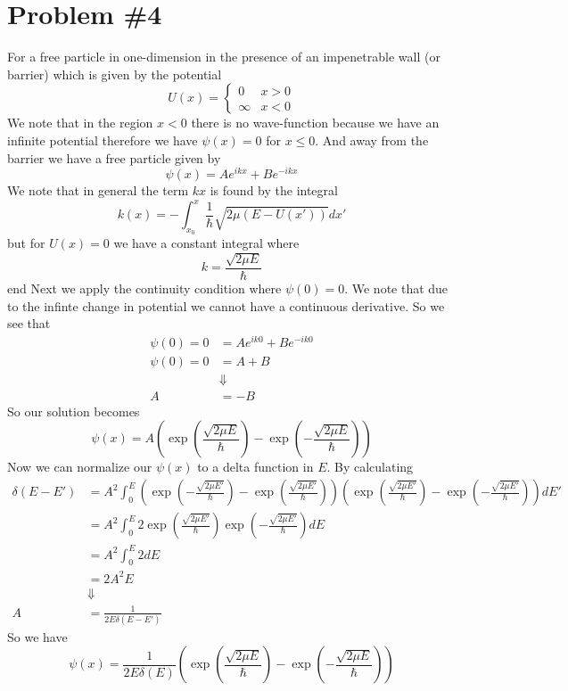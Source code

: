 \documentclass[11pt]{article}
\numberwithin{equation}{section}
\begin{document}
\pagebreak

\section{Problem \#4}
For a free particle in one-dimension in the presence of an impenetrable wall (or barrier) 
which is given by the potential
$$U(x) = \left\{\begin{array}{cl}
                  0       &x>0\\ 
                  \infty  &x<0
          \end{array}\right.$$
We note that in the region $x<0$ there is no wave-function because we have an infinite 
potential therefore we have $\psi(x)=0$ for $x\le0$. And away from the barrier we have a free
particle given by
$$\psi(x) = Ae^{ikx} + Be^{-ikx}$$
We note that in general the term $kx$ is found by the integral
$$k(x) = -\int_{x_0}^{x}\frac{1}{\hbar}\sqrt{2\mu(E-U(x'))}dx'$$
but for $U(x)=0$ we have a constant integral where 
$$k = \frac{\sqrt{2\mu{E}}}{\hbar}$$
end
Next we apply the continuity condition where $\psi(0) = 0$. We note that due to the infinte
change in potential we cannot have a continuous derivative. So we see that
\begin{align*}
\psi(0) = 0 &= Ae^{ik0} + Be^{-ik0}\\
\psi(0) = 0 &= A + B\\
&\Downarrow\\
A &= -B
\end{align*}
So our solution becomes
$$\psi(x) = A\left(\exp\left(\frac{\sqrt{2\mu{E}}}{\hbar}\right) - \exp\left(-\frac{\sqrt{2\mu{E}}}{\hbar}\right)\right)$$
Now we can normalize our $\psi(x)$ to a delta function in $E$. By calculating 
\begin{align*}
\delta(E-E') &= A^2\int_{0}^{E}\left(\exp\left(-\frac{\sqrt{2\mu{E'}}}{\hbar}\right) - \exp\left(\frac{\sqrt{2\mu{E'}}}{\hbar}\right)\right)\left(\exp\left(\frac{\sqrt{2\mu{E'}}}{\hbar}\right) - \exp\left(-\frac{\sqrt{2\mu{E'}}}{\hbar}\right)\right)dE'\\
&= A^2\int_{0}^{E}2\exp\left(\frac{\sqrt{2\mu{E'}}}{\hbar}\right)\exp\left(-\frac{\sqrt{2\mu{E'}}}{\hbar}\right)dE\\
&= A^2\int_{0}^{E}2dE\\
&= 2A^2E\\
&\Downarrow\\
A &= \frac{1}{2E\delta(E-E')}
\end{align*}
So we have
$$\psi(x) = \frac{1}{2E\delta(E)}\left(\exp\left(\frac{\sqrt{2\mu{E}}}{\hbar}\right) - \exp\left(-\frac{\sqrt{2\mu{E}}}{\hbar}\right)\right)$$
\end{document}
